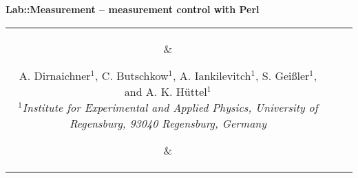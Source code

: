\documentclass[portrait]{a0poster}
\begin{document}
\color{text}
\Large
%
\newlength{\seplength}
\newlength{\headerheight}
\newlength{\columnheight}
\newlength{\columnheighta}
\newlength{\columnheightb}
%
\setlength{\columnheight}{104cm}           %
\setlength{\columnheighta}{\columnheight-6cm}
\setlength{\columnheightb}{\columnheight+6.5cm}
\setlength{\columnwidth}{0.31\textwidth}   %
%
\setlength{\fboxsep}{10mm}
\setlength{\fboxrule}{0mm}
%
%
%
%
\hspace*{-1cm}\begin{minipage}[t][][t]{\textwidth-2\fboxsep-8\fboxrule}
\color{invheading}
\begin{center}
{
\VERYHuge \vspace*{-0.6cm}
\textsf{\textbf{
Lab::Measurement -- measurement control with Perl
}}
}
\\[\baselineskip]
\begin{tabular}{ccc}
\parbox{5cm}{\vspace*{-1cm}
\begin{center}
\end{center}
}
&
\parbox{70cm}{
\begin{center} 
{
\vspace*{-0.5cm}
\huge 
A. Dirnaichner$^1$, C. Butschkow$^1$, A. Iankilevitch$^1$, S. Gei\ss{}ler$^1$, 
and A. K. Hüttel$^1$
}
\\[\medskipamount]
\it 
\Large
$^1$Institute for Experimental and Applied
Physics, University of Regensburg, 93040 Regensburg, Germany\\
\end{center}
\vspace*{0.5cm}
}
&
\parbox{5cm}{\vspace*{-1cm}
\begin{center}
\end{center}
}
\end{tabular}
\end{center}
\end{minipage}
\vspace*{9mm}
\end{document}
